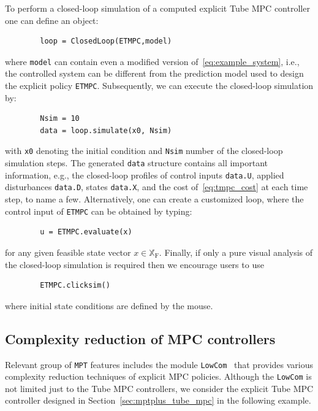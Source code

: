 \documentclass[letterpaper, 10 pt, conference]{ieeeconf}
\begin{document}
	To perform a closed-loop simulation of a computed explicit Tube MPC controller one can define an object:
	\begin{verbatim}
		loop = ClosedLoop(ETMPC,model)
	\end{verbatim}
	where \verb|model| can contain even a modified version of~\eqref{eq:example_system}, i.e., the controlled system can be different from the prediction model used to design the explicit policy \verb|ETMPC|. Subsequently, we can execute the closed-loop simulation by:
	\begin{verbatim}
		Nsim = 10
		data = loop.simulate(x0, Nsim)
	\end{verbatim}	
	with \verb|x0| denoting the initial condition and \verb|Nsim| number of the closed-loop simulation steps. The generated \verb|data| structure contains all important information, e.g., the closed-loop profiles of control inputs \verb|data.U|, applied disturbances \verb|data.D|, states \verb|data.X|, and the cost of~\eqref{eq:tmpc_cost} at each time step, to name a few.
	Alternatively, one can create a customized loop, where the control input of \verb|ETMPC| can be obtained by typing: 
	\begin{verbatim}
		u = ETMPC.evaluate(x)
	\end{verbatim}
	for any given feasible state vector $x\in\mathbb{X}_{\mathrm{F}}$.
	Finally, if only a pure visual analysis of the closed-loop simulation is required then we encourage users to use
	\begin{verbatim}
		ETMPC.clicksim()
	\end{verbatim}
	where initial state conditions are defined by the mouse.
	
	\subsection{Complexity reduction of MPC controllers}
	\label{sec:code_mpt3lowcom}
	
	Relevant group of \texttt{MPT} features includes the module \texttt{LowCom}~\cite{KH15} that provides various complexity reduction techniques of explicit MPC policies. Although the \texttt{LowCom} is not limited just to the Tube MPC controllers, we consider the explicit Tube MPC controller designed in Section~\ref{sec:mptplus_tube_mpc} in the following example.
	
\end{document}
